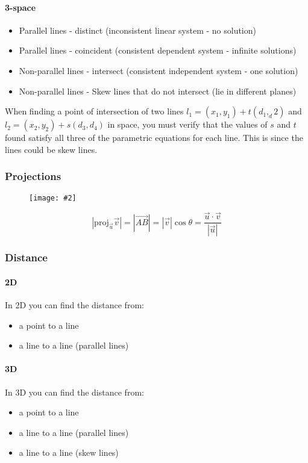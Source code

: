 \documentclass{report}
\newcommand{\diagram}[2][0.5]{
	\begin{figure}[H]
		\centering
		\texttt{[image: \#2]}
	\end{figure}
	}
\theoremstyle{definition}
\numberwithin{equation}{section}
\begin{document}
\paragraph{3-space}
\begin{itemize}
	\item Parallel lines - distinct (inconsistent linear system - no solution)
	\item Parallel lines - coincident (consistent dependent system - infinite solutions)
	\item Non-parallel lines - intersect (consistent independent system - one solution)
	\item Non-parallel lines - Skew lines that do not intersect (lie in different planes)
\end{itemize}
When finding a point of intersection of two lines $l_1 = (x_1,y_1) + t(d_1,_d2)$ and $l_2 = (x_2,y_2) + s(d_3,d_4)$ in space, you must verify that the values of $s$ and $t$ found satisfy all three of the parametric equations for each line. This is since the lines could be skew lines.

\subsubsection{Projections}
\diagram{projection}
\begin{equation}
	|\mathrm{proj}_{\vec u} \vec v | = |\overrightarrow{AB}| = |\vec v| \cos \theta = \frac{\vec u \cdot \vec v}{|\vec u|}
\end{equation}

\subsubsection{Distance}
\paragraph{2D}
In 2D you can find the distance from:
\begin{itemize}
	\item a point to a line
	\item a line to a line (parallel lines)
\end{itemize}

\paragraph{3D}
In 3D you can find the distance from:
\begin{itemize}
	\item a point to a line
	\item a line to a line (parallel lines)
	\item a line to a line (skew lines)
\end{itemize}
\end{document}

